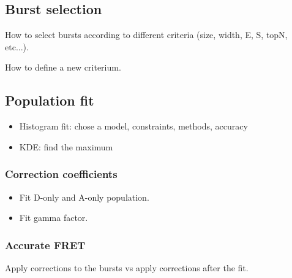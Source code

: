 \subsection{Burst selection}

How to select bursts according to different criteria (size, width, E, S, topN, etc...).

How to define a new criterium.


\subsection{Population fit}

\begin{itemize}
\item Histogram fit: chose a model, constraints, methods, accuracy
\item KDE: find the maximum
\end{itemize}

\subsubsection{Correction coefficients}

\begin{itemize}
\item Fit D-only and A-only population.
\item Fit gamma factor.
\end{itemize}


\subsubsection{Accurate FRET}

Apply corrections to the bursts vs apply corrections after the fit.

